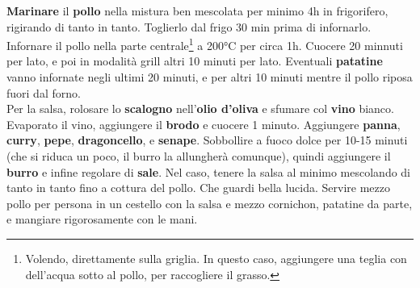 \medskip

\textbf{Marinare} il \textbf{pollo} nella mistura ben mescolata per minimo 4h in frigorifero, rigirando di tanto in tanto.
Toglierlo dal frigo 30 min prima di infornarlo.
Infornare il pollo nella parte centrale\footnote{Volendo, direttamente sulla griglia. In questo caso, aggiungere una teglia con dell'acqua sotto al pollo, per raccogliere il grasso.} a 200°C per circa 1h.
Cuocere 20 minnuti per lato, e poi in modalità grill altri 10 minuti per lato. 
Eventuali \textbf{patatine} vanno infornate negli ultimi 20 minuti, e per altri 10 minuti mentre il pollo riposa fuori dal forno. \\
Per la salsa, rolosare lo \textbf{scalogno }nell'\textbf{olio d'oliva} e sfumare col \textbf{vino }bianco.
Evaporato il vino, aggiungere il \textbf{brodo} e cuocere 1 minuto. 
Aggiungere \textbf{panna}, \textbf{curry}, \textbf{pepe}, \textbf{dragoncello}, e \textbf{senape}.
Sobbollire a fuoco dolce per 10-15 minuti (che si riduca un poco, il burro la allungherà comunque), quindi aggiungere il \textbf{burro} e infine regolare di \textbf{sale}. 
Nel caso, tenere la salsa al minimo mescolando di tanto in tanto fino a cottura del pollo.
Che guardi bella lucida. 
Servire mezzo pollo per persona in un cestello con la salsa e mezzo cornichon, patatine da parte, e mangiare rigorosamente con le mani.

\vspace*{0.75 cm}

\begin{recipeblock}
	
\end{recipeblock}